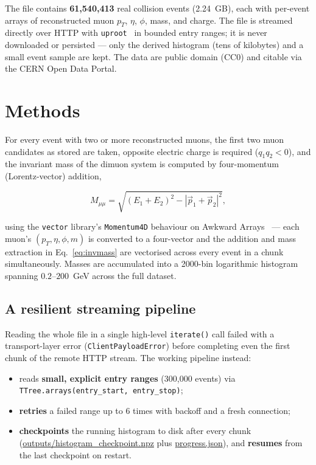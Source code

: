 \documentclass[11pt,a4paper]{article}
\begin{document}
The file contains \textbf{61,540,413} real collision events (2.24~GB), each with per-event arrays
of reconstructed muon $p_T$, $\eta$, $\phi$, mass, and charge. The file is streamed directly over
HTTP with \texttt{uproot}~\cite{uproot} in bounded entry ranges; it is never downloaded or
persisted --- only the derived histogram (tens of kilobytes) and a small event sample are kept.
The data are public domain (CC0) and citable via the CERN Open Data Portal.

\section{Methods}

For every event with two or more reconstructed muons, the first two muon candidates as stored are
taken, opposite electric charge is required ($q_1 q_2 < 0$), and the invariant mass of the dimuon
system is computed by four-momentum (Lorentz-vector) addition,

\begin{equation}
M_{\mu\mu} = \sqrt{(E_1+E_2)^2 - |\vec{p}_1+\vec{p}_2|^2},
\label{eq:invmass}
\end{equation}

using the \texttt{vector} library's \texttt{Momentum4D} behaviour on Awkward
Arrays~\cite{awkward,vector} --- each muon's $(p_T,\eta,\phi,m)$ is converted to a four-vector and
the addition and mass extraction in Eq.~\eqref{eq:invmass} are vectorised across every event in a
chunk simultaneously. Masses are accumulated into a 2000-bin logarithmic histogram spanning
$0.2$--$200$~GeV across the full dataset.

\subsection{A resilient streaming pipeline}

Reading the whole file in a single high-level \texttt{iterate()} call failed with a
transport-layer error (\texttt{ClientPayloadError}) before completing even the first chunk of the
remote HTTP stream. The working pipeline instead:

\begin{itemize}
\item reads \textbf{small, explicit entry ranges} (300{,}000 events) via
  \texttt{TTree.arrays(entry\_start, entry\_stop)};
\item \textbf{retries} a failed range up to 6 times with backoff and a fresh connection;
\item \textbf{checkpoints} the running histogram to disk after every chunk
  (\url{outputs/histogram_checkpoint.npz} plus \url{progress.json}), and \textbf{resumes}
  from the last checkpoint on restart.
\end{itemize}
\end{document}
